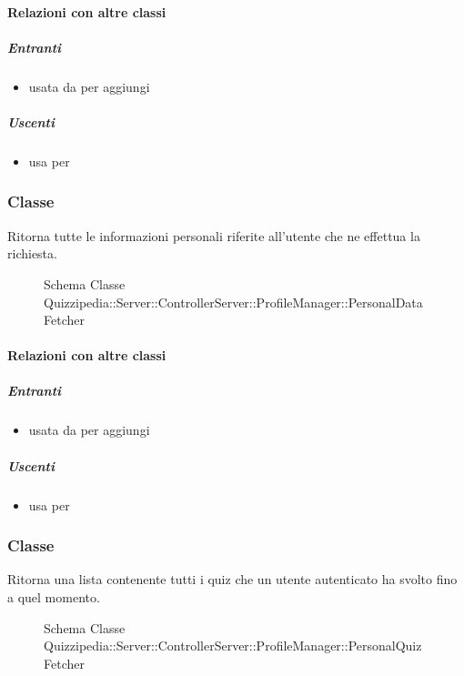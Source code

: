 \paragraph{Relazioni con altre classi}
\subparagraph{Entranti}
\begin{itemize}
\item usata da  per aggiungi
\end{itemize}
\subparagraph{Uscenti}
\begin{itemize}
\item usa  per 
\end{itemize}
\subsubsection{Classe }
Ritorna tutte le informazioni personali riferite all'utente che ne effettua la richiesta.
\begin{figure}[H]
\centering
\noindent{}
\caption[Schema Classe PersonalDataFetcher]{Schema Classe Quizzipedia::Server::ControllerServer::ProfileManager::PersonalDataFetcher}
\end{figure}
\paragraph{Relazioni con altre classi}
\subparagraph{Entranti}
\begin{itemize}
\item usata da  per aggiungi
\end{itemize}
\subparagraph{Uscenti}
\begin{itemize}
\item usa  per 
\end{itemize}
\subsubsection{Classe }
Ritorna una lista contenente tutti i quiz che un utente autenticato ha svolto fino a quel momento.
\begin{figure}[H]
\centering
\noindent{}
\caption[Schema Classe PersonalQuizFetcher]{Schema Classe Quizzipedia::Server::ControllerServer::ProfileManager::PersonalQuizFetcher}
\end{figure}
